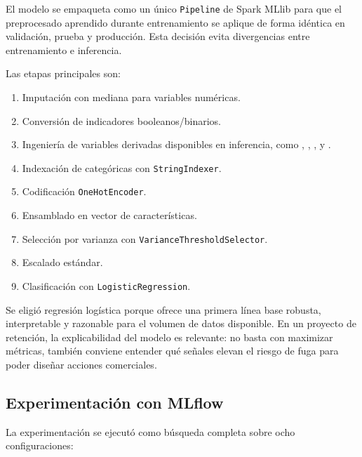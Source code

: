 \documentclass[12pt,a4paper]{article}
\begin{document}
El modelo se empaqueta como un único \texttt{Pipeline} de Spark MLlib para que el preprocesado aprendido durante entrenamiento se aplique de forma idéntica en validación, prueba y producción. Esta decisión evita divergencias entre entrenamiento e inferencia.

Las etapas principales son:

\begin{enumerate}
    \item Imputación con mediana para variables numéricas.
    \item Conversión de indicadores booleanos/binarios.
    \item Ingeniería de variables derivadas disponibles en inferencia, como , , ,  y .
    \item Indexación de categóricas con \texttt{StringIndexer}.
    \item Codificación \texttt{OneHotEncoder}.
    \item Ensamblado en vector de características.
    \item Selección por varianza con \texttt{VarianceThresholdSelector}.
    \item Escalado estándar.
    \item Clasificación con \texttt{LogisticRegression}.
\end{enumerate}

Se eligió regresión logística porque ofrece una primera línea base robusta, interpretable y razonable para el volumen de datos disponible. En un proyecto de retención, la explicabilidad del modelo es relevante: no basta con maximizar métricas, también conviene entender qué señales elevan el riesgo de fuga para poder diseñar acciones comerciales.

\subsection{Experimentación con MLflow}

La experimentación se ejecutó como búsqueda completa sobre ocho configuraciones:
\end{document}
